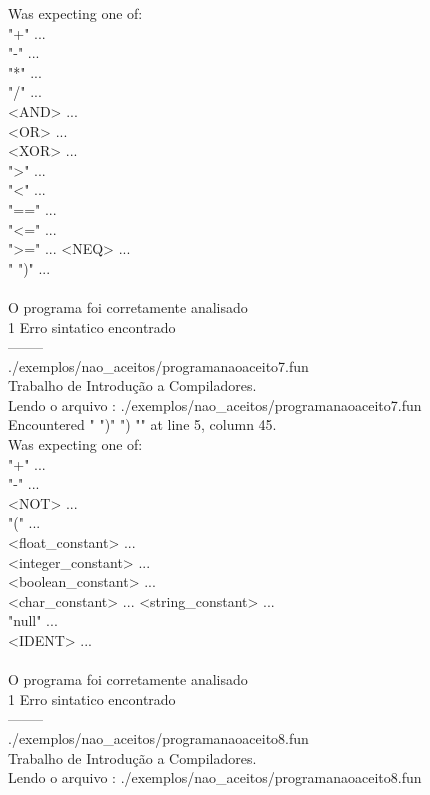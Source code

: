 \documentclass[
	article,			%
	11pt,				%
	oneside,			%
	a4paper,			%
	portuguese,			%
	brazil,				%
	sumario=tradicional
	]{abntex2}
\begin{document}
Was expecting one of:\\
    "+" ...\\
    "-" ...\\
    "*" ...\\
    "/" ...\\
    <AND> ...\\
    <OR> ...\\
    <XOR> ...\\
    ">" ...\\
    "<" ...\\
    "==" ...\\
    "<=" ...\\
    ">=" ...
    <NEQ> ...\\
    "%
    ")" ...\\
\\
O programa foi corretamente analisado\\
1 Erro sintatico encontrado\\
--------\\
./exemplos/nao\_aceitos/programanaoaceito7.fun\\
Trabalho de Introdução a Compiladores.\\
Lendo o arquivo : ./exemplos/nao\_aceitos/programanaoaceito7.fun\\
Encountered " ")" ") "" at line 5, column 45.\\
Was expecting one of:\\
    "+" ...\\
    "-" ...\\
    <NOT> ...\\
    "(" ...\\
    <float\_constant> ...\\
    <integer\_constant> ...\\
    <boolean\_constant> ...\\
    <char\_constant> ...
    <string\_constant> ...\\
    "null" ...\\
    <IDENT> ...\\
\\
O programa foi corretamente analisado\\
1 Erro sintatico encontrado\\
--------\\
./exemplos/nao\_aceitos/programanaoaceito8.fun\\
Trabalho de Introdução a Compiladores.\\
Lendo o arquivo : ./exemplos/nao\_aceitos/programanaoaceito8.fun\\
\end{document}
